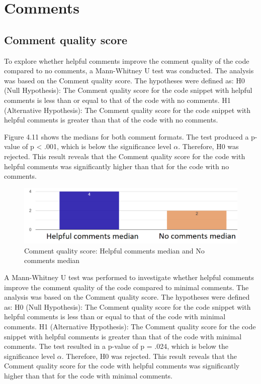 \section{Comments}

\subsection{Comment quality score}

To explore whether helpful comments improve the comment quality of the code compared to no comments, a Mann-Whitney U test was conducted.  The analysis was based on the Comment quality score. The hypotheses were defined as: H0 (Null Hypothesis): The Comment quality score for the code snippet with helpful comments is less than or equal to that of the code with no comments.  H1 (Alternative Hypothesis): The Comment quality score for the code snippet with helpful comments is greater than that of the code with no comments.

Figure 4.11 shows the medians for both comment formats.
The test produced a p-value of p < .001, which is below the significance level $\alpha$. Therefore, H0 was rejected. This result reveals that the Comment quality score for the code with helpful comments was significantly higher than that for the code with no comments.

\begin{figure} [H]
  \centering
  \includegraphics[scale=0.6]{figures/h-0-q4.png}
  \caption{Comment quality score: Helpful comments median and No comments median}
  \label{fig:AnhangsChor}
\end{figure}


A Mann-Whitney U test was performed to investigate whether helpful comments improve the comment quality of the code compared to minimal comments. The analysis was based on the Comment quality score. The hypotheses were defined as: H0 (Null Hypothesis): The Comment quality score for the code snippet with helpful comments is less than or equal to that of the code with minimal comments.  H1 (Alternative Hypothesis): The Comment quality score for the code snippet with helpful comments is greater than that of the code with minimal comments. The test resulted in a p-value of p = .024, which is below the significance level $\alpha $. Therefore, H0 was rejected. This result reveals that the Comment quality score for the code with helpful comments was significantly higher than that for the code with minimal comments.





